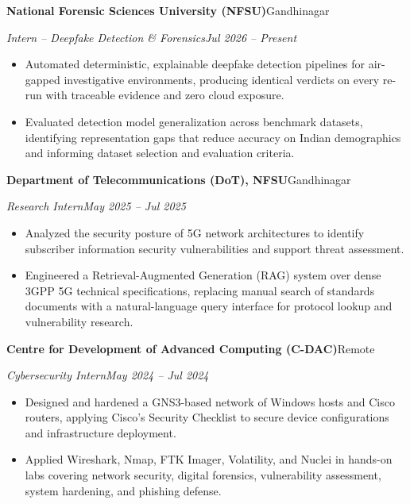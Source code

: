\documentclass[10pt,a4paper]{article}
\newcommand{\cventry}[4]{%
  \vspace{6pt}%
  \needspace{5\baselineskip}%
  \textbf{#1}\hfill #2\par\nopagebreak[4]%
  \textit{#3}\hfill\textit{#4}\par\nopagebreak[4]%
  \vspace{1.5pt}\nopagebreak[4]%
}
\begin{document}
\cventry{National Forensic Sciences University (NFSU)}{Gandhinagar}%
  {Intern -- Deepfake Detection \& Forensics}{Jul 2026 -- Present}
\begin{itemize}
  \item Automated deterministic, explainable deepfake detection pipelines for air-gapped investigative environments, producing identical verdicts on every re-run with traceable evidence and zero cloud exposure.
  \item Evaluated detection model generalization across benchmark datasets, identifying representation gaps that reduce accuracy on Indian demographics and informing dataset selection and evaluation criteria.
\end{itemize}

\cventry{Department of Telecommunications (DoT), NFSU}{Gandhinagar}%
  {Research Intern}{May 2025 -- Jul 2025}
\begin{itemize}
  \item Analyzed the security posture of 5G network architectures to identify subscriber information security vulnerabilities and support threat assessment.
  \item Engineered a Retrieval-Augmented Generation (RAG) system over dense 3GPP 5G technical specifications, replacing manual search of standards documents with a natural-language query interface for protocol lookup and vulnerability research.
\end{itemize}

\cventry{Centre for Development of Advanced Computing (C-DAC)}{Remote}%
  {Cybersecurity Intern}{May 2024 -- Jul 2024}
\begin{itemize}
  \item Designed and hardened a GNS3-based network of Windows hosts and Cisco routers, applying Cisco's Security Checklist to secure device configurations and infrastructure deployment.
  \item Applied Wireshark, Nmap, FTK Imager, Volatility, and Nuclei in hands-on labs covering network security, digital forensics, vulnerability assessment, system hardening, and phishing defense.
\end{itemize}
\end{document}
